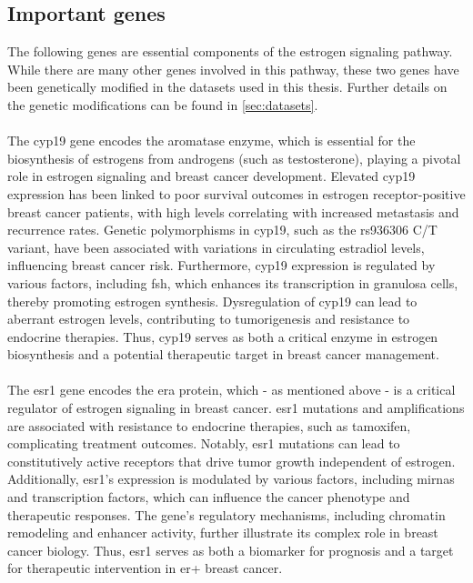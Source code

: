 \subsection{Important genes}

The following genes are essential components of the estrogen signaling pathway.
While there are many other genes involved in this pathway, these two genes have
been genetically modified in the datasets used in this thesis.
Further details on the genetic modifications can be found in
\cref{sec:datasets}.

\paragraph{}
The \gls{cyp19} gene encodes the aromatase enzyme, which is essential for the
biosynthesis of estrogens from androgens (such as testosterone), playing a
pivotal role in estrogen signaling and breast cancer development.
Elevated \gls{cyp19} expression has been linked to poor survival outcomes in
estrogen receptor-positive breast cancer patients, with high levels correlating
with increased metastasis and recurrence
rates\supercite{barros-oliveira_cyp19a1_2020,friesenhengst_elevated_2018}.
Genetic polymorphisms in \gls{cyp19}, such as the rs936306 C/T variant, have
been associated with variations in circulating estradiol levels, influencing
breast cancer risk\supercite{ghosh_potential_2012}.
Furthermore, \gls{cyp19} expression is regulated by various factors, including
\gls{fsh}, which enhances its transcription in granulosa cells, thereby
promoting estrogen
synthesis\supercite{savolainen-peltonen_estrogen_2018,li_microrna-7a2_2022}.
Dysregulation of \gls{cyp19} can lead to aberrant estrogen levels, contributing
to tumorigenesis and resistance to endocrine
therapies\supercite{dabydeen_comparison_2015}.
Thus, \gls{cyp19} serves as both a critical enzyme in estrogen biosynthesis and
a potential therapeutic target in breast cancer management.

\paragraph{}
The \gls{esr1} gene encodes the \gls{era} protein, which - as mentioned above -
is a critical regulator of estrogen signaling in breast cancer.
\Gls{esr1} mutations and amplifications are associated with resistance to
endocrine
therapies, such as tamoxifen, complicating treatment
outcomes\supercite{aguilar_biological_2010,jeselsohn_emergence_2014}.
Notably, \gls{esr1} mutations can lead to constitutively active receptors that
drive tumor growth independent of estrogen\supercite{toy_activating_2017}.
Additionally, \gls{esr1}'s expression is modulated by various factors,
including \glspl{mirna} and transcription factors, which can influence the
cancer phenotype and therapeutic responses\supercite{mansoori_mir-142-3p_2019}.
The gene's regulatory mechanisms, including chromatin remodeling and enhancer
activity, further illustrate its complex role in breast cancer
biology\supercite{powers_proteasome_2013,tomita_cluster_2015}.
Thus, \gls{esr1} serves as both a biomarker for prognosis and a target for
therapeutic intervention in \gls{er+} breast cancer.
